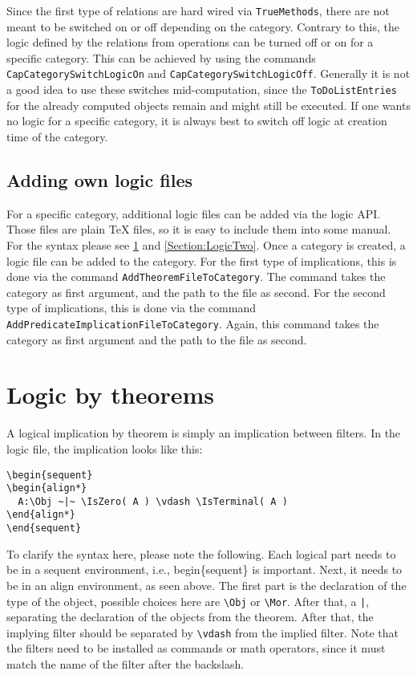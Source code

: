 Since the first type of relations are hard wired via \texttt{TrueMethods}, there are not
meant to be switched on or off depending on the category. Contrary to this, the logic defined
by the relations from operations can be turned off or on for a specific \CapPkg category.
This can be achieved by using the commands \texttt{CapCategorySwitchLogicOn} and \texttt{CapCategorySwitchLogicOff}.
Generally it is not a good idea to use these switches mid-computation, since the \texttt{ToDoListEntries} for the
already computed objects remain and might still be executed. If one wants no logic for a specific category,
it is always best to switch off logic at creation time of the category.

\subsection{Adding own logic files}

For a specific category, additional logic files can be added via the \CapPkg logic API. Those files are
plain TeX files, so it is easy to include them into some manual. For the syntax please see \ref{Section:LogicOne} and \ref{Section:LogicTwo}.
Once a category is created, a logic file can be added to the category.
For the first type of implications, this is done via the command
\texttt{AddTheoremFileToCategory}. The command takes the category as first argument, and the path to the file as
second. For the second type of implications, this is done via the command \texttt{AddPredicateImplicationFileToCategory}.
Again, this command takes the category as first argument and the path to the file as second.

\section{Logic by theorems} \label{Section:LogicOne}

A logical implication by theorem is simply an implication between \GAP filters. In the logic file, the implication looks like this:
\begin{Verbatim}[frame=single]
\begin{sequent}
\begin{align*}
  A:\Obj ~|~ \IsZero( A ) \vdash \IsTerminal( A )
\end{align*}
\end{sequent}
\end{Verbatim}
To clarify the syntax here, please note the following. Each logical part needs to be in a sequent environment, i.e., begin\{sequent\}
is important. Next, it needs to be in an align\* environment, as seen above. The first part is the declaration of the type of the \GAP object,
possible choices here are \texttt{\textbackslash Obj} or \texttt{\textbackslash Mor}. After that, a \texttt{|}, separating the declaration of the objects from the
theorem. After that, the implying filter should be separated by \texttt{\textbackslash vdash} from the implied filter. Note that the filters
need to be installed as commands or math operators, since it must match the name of the \GAP filter after the backslash.

